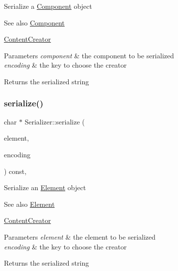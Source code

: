 Serialize a \mbox{\hyperlink{classComponent}{Component}} object \begin{DoxySeeAlso}{See also}
\mbox{\hyperlink{classComponent}{Component}} 

\mbox{\hyperlink{classContentCreator}{Content\+Creator}}
\end{DoxySeeAlso}

\begin{DoxyParams}{Parameters}
{\em component} & the component to be serialized \\
\hline
{\em encoding} & the key to choose the creator \\
\hline
\end{DoxyParams}
\begin{DoxyReturn}{Returns}
the serialized string 
\end{DoxyReturn}
\mbox{\label{classSerializer_a38bec517fb3b3cc0778c75b807cb930c}} 
\subsubsection{\texorpdfstring{serialize()}{serialize()}\hspace{0.1cm}{\footnotesize\ttfamily [2/2]}}
{\footnotesize\ttfamily char $\ast$ Serializer\+::serialize (\begin{DoxyParamCaption}\item[{\mbox{\hyperlink{classElement}{Element}} $\ast$}]{element,  }\item[{const char $\ast$}]{encoding }\end{DoxyParamCaption}) const\hspace{0.3cm}{\ttfamily [virtual]}, {\ttfamily [inherited]}}

Serialize an \mbox{\hyperlink{classElement}{Element}} object \begin{DoxySeeAlso}{See also}
\mbox{\hyperlink{classElement}{Element}} 

\mbox{\hyperlink{classContentCreator}{Content\+Creator}}
\end{DoxySeeAlso}

\begin{DoxyParams}{Parameters}
{\em element} & the element to be serialized \\
\hline
{\em encoding} & the key to choose the creator \\
\hline
\end{DoxyParams}
\begin{DoxyReturn}{Returns}
the serialized string 
\end{DoxyReturn}
\mbox{\label{classSerializer_aee483f1845ca1b7f7ac4243de9902750}} 
